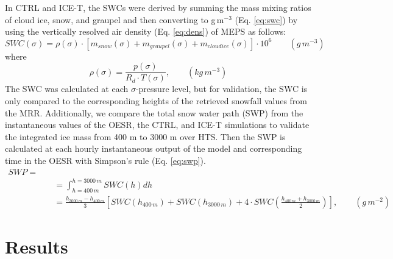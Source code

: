 \documentclass{ametsocV5}
\begin{document}
		In CTRL and ICE-T, the SWCs were derived by summing the mass mixing ratios of cloud ice, snow, and graupel and then converting to g\,m$^{-3}$ (Eq. \ref{eq:swc}) by using the vertically resolved air density (Eq. \ref{eq:dens}) of MEPS as follows:
		\begin{equation}
			SWC(\sigma) = \rho(\sigma) \cdot [m_{snow}(\sigma) + m_{graupel}(\sigma) + m_{cloud ice}(\sigma)] \cdot 10^6 \qquad (g\,m^{-3})
			\label{eq:swc}
		\end{equation}
		where
		\begin{equation}
			\rho(\sigma) = \frac{p(\sigma)}{R_d \cdot T(\sigma)}, \qquad (kg\,m^{-3})
			\label{eq:dens}
		\end{equation}
		The SWC was calculated at each $\sigma$-pressure level, but for validation, the SWC is only compared to the corresponding heights of the retrieved snowfall values from the MRR. Additionally, we compare the total snow water path (SWP) from the instantaneous values of the OESR, the CTRL, and ICE-T simulations to validate the integrated ice mass from 400 m to 3000 m over HTS. Then the SWP is calculated at each hourly instantaneous output of the model and corresponding time in the OESR with Simpson's rule (Eq. \ref{eq:swp}).
		\begin{equation}
		\begin{split}
		SWP =\\
		&\quad = \int_{h = 400\,m}^{h = 3000\,m} SWC(h) dh  \\
		&\quad = \frac{h_{3000\,m} - h_{400\,m}}{3} \left[ SWC(h_{400\,m}) + SWC(h_{3000\,m}) + 4 \cdot SWC \left( \frac{h_{400\,m} + h_{3000\,m}}{2}\right) \right], \qquad (g\,m^{-2})
		\end{split}
		\label{eq:swp}
		\end{equation}
		



\section{Results}\label{sec:res}
\end{document}
